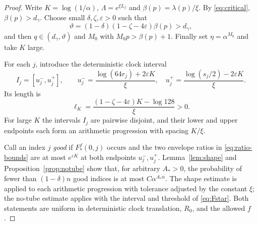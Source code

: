 \documentclass[11pt,reqno]{amsart}
\theoremstyle{plain}
\theoremstyle{definition}
\theoremstyle{remark}
\newcommand{\1}{\mathbf{1}}
\begin{document}
\begin{proof}
Write $K=\log(1/\alpha)$, $\Lambda=e^{\xi L_f}$ and $\beta(p)=\lambda(p)/\xi$. By \eqref{eq:critical}, $\beta(p)>d_\gamma$. Choose small $\delta,\zeta,\varepsilon>0$ such that
\begin{equation}\label{eq:gap}
\vartheta=(1-\delta)(1-\zeta-4\varepsilon)\beta(p)>d_\gamma,
\end{equation}
and then $q\in(d_\gamma,\vartheta)$ and $M_0$ with $M_0p>\beta(p)+1$. Finally set $\eta=\alpha^{M_0}$ and take $K$ large.

For each $j$, introduce the deterministic clock interval
\begin{equation}\label{eq:cores}
I_j=[u_j^-,u_j^+],\qquad
u_j^- =\frac{\log(64r_j)+2\varepsilon K}{\xi},\quad
u_j^+=\frac{\log(s_j/2)-2\varepsilon K}{\xi}.
\end{equation}
Its length is
\[
\ell_K=\frac{(1-\zeta-4\varepsilon)K-\log128}{\xi}>0.
\]
For large $K$ the intervals $I_j$ are pairwise disjoint, and their lower and upper endpoints each form an arithmetic progression with spacing $K/\xi$.

Call an index $j$ \emph{good} if $F_*^f(0,j)$ occurs and the two envelope ratios in \eqref{eq:ratio-bounds} are at most $e^{\varepsilon K}$ at both endpoints $u_j^-,u_j^+$. Lemma~\ref{lem:shape} and Proposition~\ref{prop:notube} show that, for arbitrary $A_*>0$, the probability of fewer than $(1-\delta)n$ good indices is at most $C\alpha^{A_*n}$. The shape estimate is applied to each arithmetic progression with tolerance adjusted by the constant $\xi$; the no-tube estimate applies with the interval and threshold of \eqref{eq:Fstar}. Both statements are uniform in deterministic clock translation, $R_0$, and the allowed $f$.


\end{proof}
\end{document}
